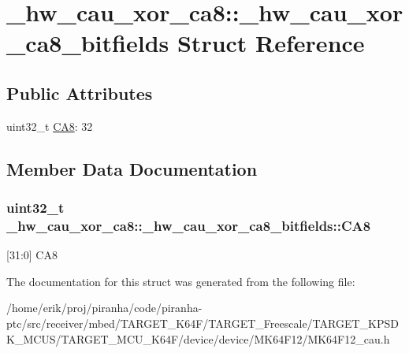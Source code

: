 \hypertarget{struct__hw__cau__xor__ca8_1_1__hw__cau__xor__ca8__bitfields}{}\section{\+\_\+hw\+\_\+cau\+\_\+xor\+\_\+ca8\+:\+:\+\_\+hw\+\_\+cau\+\_\+xor\+\_\+ca8\+\_\+bitfields Struct Reference}
\label{struct__hw__cau__xor__ca8_1_1__hw__cau__xor__ca8__bitfields}
\subsection*{Public Attributes}
\begin{DoxyCompactItemize}
\item 
uint32\+\_\+t \hyperlink{struct__hw__cau__xor__ca8_1_1__hw__cau__xor__ca8__bitfields_a5f07ec7bb8164828e73d05d3ca7f9edb}{C\+A8}\+: 32
\end{DoxyCompactItemize}


\subsection{Member Data Documentation}
\subsubsection[{\texorpdfstring{C\+A8}{CA8}}]{\setlength{\rightskip}{0pt plus 5cm}uint32\+\_\+t \+\_\+hw\+\_\+cau\+\_\+xor\+\_\+ca8\+::\+\_\+hw\+\_\+cau\+\_\+xor\+\_\+ca8\+\_\+bitfields\+::\+C\+A8}\hypertarget{struct__hw__cau__xor__ca8_1_1__hw__cau__xor__ca8__bitfields_a5f07ec7bb8164828e73d05d3ca7f9edb}{}\label{struct__hw__cau__xor__ca8_1_1__hw__cau__xor__ca8__bitfields_a5f07ec7bb8164828e73d05d3ca7f9edb}
\mbox{[}31\+:0\mbox{]} C\+A8 

The documentation for this struct was generated from the following file\+:\begin{DoxyCompactItemize}
\item 
/home/erik/proj/piranha/code/piranha-\/ptc/src/receiver/mbed/\+T\+A\+R\+G\+E\+T\+\_\+\+K64\+F/\+T\+A\+R\+G\+E\+T\+\_\+\+Freescale/\+T\+A\+R\+G\+E\+T\+\_\+\+K\+P\+S\+D\+K\+\_\+\+M\+C\+U\+S/\+T\+A\+R\+G\+E\+T\+\_\+\+M\+C\+U\+\_\+\+K64\+F/device/device/\+M\+K64\+F12/M\+K64\+F12\+\_\+cau.\+h\end{DoxyCompactItemize}
